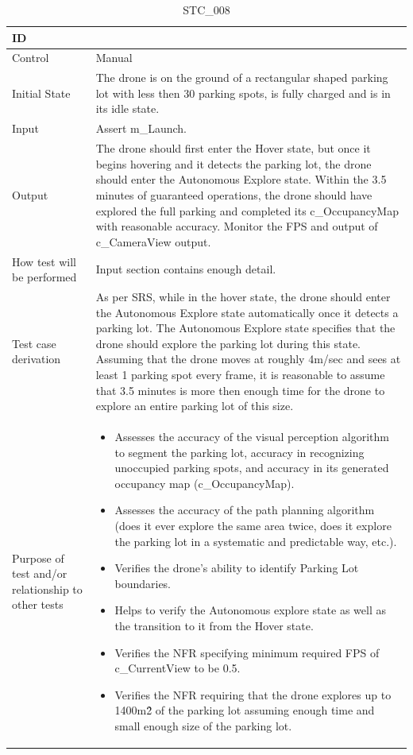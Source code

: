 \documentclass[12pt, titlepage]{article}
\begin{document}
\begin{table}[!h]
\begin{center}
\caption {STC\_008}
\label{tab:STC_008}
\begin{tabular}{ | m{3.2cm} | m{12.2cm} | } 
\hline
ID & \nameref{tab:STC_008} \\ 
\hline
Control & Manual \\ 
\hline
Initial State & The drone is on the ground of a rectangular shaped parking lot with less then 30 parking spots, is fully charged and is in its idle state.  \\ 
\hline
Input & Assert m\_Launch. \\ 
\hline
Output & The drone should first enter the Hover state, but once it begins hovering and it detects the parking lot, the drone should enter the Autonomous Explore state. Within the 3.5 minutes of guaranteed operations, the drone should have explored the full parking and completed its c\_OccupancyMap with reasonable accuracy. 
Monitor the FPS and output of c\_CameraView output. \\ 
\hline
How test will be performed & Input section contains enough detail. \\ 
\hline
Test case derivation & As per SRS, while in the hover state, the drone should enter the Autonomous Explore state automatically once it detects a parking lot. The Autonomous Explore state specifies that the drone should explore the parking lot during this state. Assuming that the drone moves at roughly 4m/sec and sees at least 1 parking spot every frame, it is reasonable to assume that 3.5 minutes is more then enough time for the drone to explore an entire parking lot of this size.
 \\ 
\hline
Purpose of test and/or relationship to other tests & 
\begin{itemize}
    \item Assesses the accuracy of the visual perception algorithm to segment the parking lot, accuracy in recognizing unoccupied parking spots, and accuracy in its generated occupancy map (c\_OccupancyMap).
    \item Assesses the accuracy of the path planning algorithm (does it ever explore the same area twice, does it explore the parking lot in a systematic and predictable way, etc.).
    \item Verifies the drone’s ability to identify Parking Lot boundaries.
    \item Helps to verify the Autonomous explore state as well as the transition to it from the Hover state.
    \item Verifies the NFR specifying minimum required FPS of c\_CurrentView to be 0.5.
    \item Verifies the NFR requiring that the drone explores up to 1400m\^2 of the parking lot assuming enough time and small enough size of the parking lot.
\end{itemize}
\\ 
\hline
\end{tabular}
\end{center}
\end{table}
\end{document}
